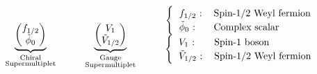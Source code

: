 \begin{align}
    \underbrace{\begin{pmatrix}
        f_{\small{1/2}} \\
        \tilde{\phi}_0
    \end{pmatrix}}_{\substack{\text{Chiral} \\ \text{Supermultiplet}}}
    \hspace{1cm}
    \underbrace{\begin{pmatrix}
        V_1 \\
        \tilde{V}_{1/2}
    \end{pmatrix}}_{\substack{\text{Gauge} \\ \text{Supermultiplet}}}
    \hspace{1cm}
    \begin{matrix}
        \begin{cases}
            \begin{tabular}{l l}
                $f_{1/2}$~: & \text{Spin-1/2 Weyl fermion} \\
                $\tilde{\phi}_0$~: & \text{Complex scalar} 
            \end{tabular}
        \end{cases} \\
        \begin{cases}
            \begin{tabular}{l l}
                $V_1$~: & \text{Spin-1 boson} \\
                $\tilde{V}_{1/2}$~: & \text{Spin-1/2 Weyl fermion}
            \end{tabular}
        \end{cases}
    \end{matrix}
    \label{eq:susy_multiplets}
\end{align}

%

